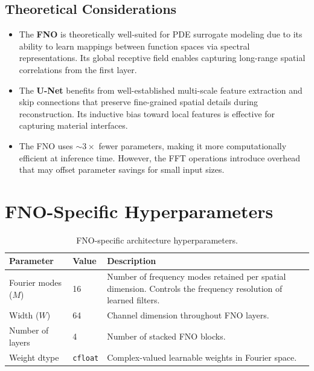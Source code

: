 \documentclass[11pt,a4paper]{article}
\begin{document}
\subsection{Theoretical Considerations}

\begin{itemize}[leftmargin=2em]
    \item The \textbf{FNO} is theoretically well-suited for PDE surrogate
          modeling due to its ability to learn mappings between function spaces
          via spectral representations. Its global receptive field enables
          capturing long-range spatial correlations from the first layer.

    \item The \textbf{U-Net} benefits from well-established multi-scale
          feature extraction and skip connections that preserve fine-grained
          spatial details during reconstruction. Its inductive bias toward
          local features is effective for capturing material interfaces.

    \item The FNO uses ${\sim}3\times$ fewer parameters, making it more
          computationally efficient at inference time. However, the FFT
          operations introduce overhead that may offset parameter savings for
          small input sizes.
\end{itemize}


\section{FNO-Specific Hyperparameters}
\label{sec:fno-hparams}

\begin{table}[H]
\centering
\caption{FNO-specific architecture hyperparameters.}
\begin{tabular}{@{}llp{7cm}@{}}
\toprule
\textbf{Parameter} & \textbf{Value} & \textbf{Description} \\
\midrule
Fourier modes ($M$) & 16 & Number of frequency modes retained per spatial
    dimension. Controls the frequency resolution of learned filters. \\[4pt]
Width ($W$) & 64 & Channel dimension throughout FNO layers. \\[4pt]
Number of layers & 4 & Number of stacked FNO blocks. \\[4pt]
Weight dtype & \texttt{cfloat} & Complex-valued learnable weights in Fourier
    space. \\
\bottomrule
\end{tabular}
\end{table}
\end{document}
